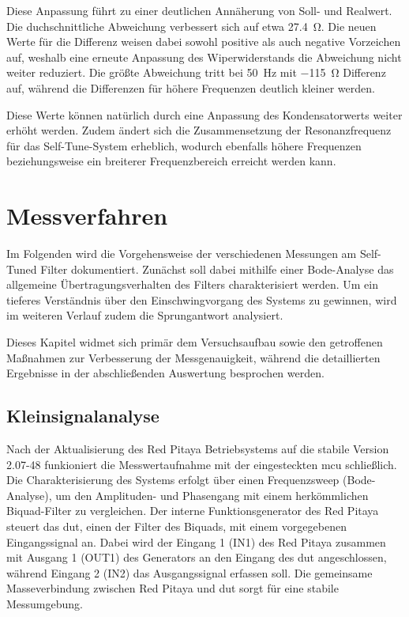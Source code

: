 \documentclass[../main_config.tex]{subfiles}
\begin{document}
Diese Anpassung führt zu einer deutlichen Annäherung von Soll- und Realwert. Die duchschnittliche Abweichung verbessert sich auf etwa \SI{27.4}{\ohm}. Die neuen Werte für die Differenz weisen dabei sowohl positive als auch negative Vorzeichen auf, weshalb eine erneute Anpassung des Wiperwiderstands die Abweichung nicht weiter reduziert. Die größte Abweichung tritt bei \SI{50}{\hertz} mit \SI{-115}{\ohm} Differenz auf, während die Differenzen für höhere Frequenzen deutlich kleiner werden.\par
\medskip

Diese Werte können natürlich durch eine Anpassung des Kondensatorwerts weiter erhöht werden. Zudem ändert sich die Zusammensetzung der Resonanzfrequenz für das Self-Tune-System erheblich, wodurch ebenfalls höhere Frequenzen beziehungsweise ein breiterer Frequenzbereich erreicht werden kann. \par
\medskip




\section{Messverfahren}

Im Folgenden wird die Vorgehensweise der verschiedenen Messungen am Self-Tuned Filter dokumentiert. Zunächst soll dabei mithilfe einer Bode-Analyse das allgemeine Übertragungsverhalten des Filters charakterisiert werden. Um ein tieferes Verständnis über den Einschwingvorgang des Systems zu gewinnen, wird im weiteren Verlauf zudem die Sprungantwort analysiert.\par
\medskip

Dieses Kapitel widmet sich primär dem Versuchsaufbau sowie den getroffenen Maßnahmen zur Verbesserung der Messgenauigkeit, während die detaillierten Ergebnisse in der abschließenden Auswertung besprochen werden.\par
\medskip

\subsection{Kleinsignalanalyse}
\label{sec:mess_ac}




Nach der Aktualisierung des Red Pitaya Betriebsystems auf die stabile Version 2.07-48 funkioniert die Messwertaufnahme mit der eingesteckten \gls{mcu} schließlich. Die Charakterisierung des Systems erfolgt über einen Frequenzsweep (Bode-Analyse), um den Amplituden- und Phasengang mit einem herkömmlichen Biquad-Filter zu vergleichen. Der interne Funktionsgenerator des Red Pitaya steuert das \gls{dut}, einen der Filter des Biquads, mit einem vorgegebenen Eingangssignal an. Dabei wird der Eingang 1 (IN1) des Red Pitaya zusammen mit Ausgang 1 (OUT1) des Generators an den Eingang des \gls{dut} angeschlossen, während Eingang 2 (IN2) das Ausgangssignal erfassen soll. Die gemeinsame Masseverbindung zwischen Red Pitaya und \gls{dut} sorgt für eine stabile Messumgebung.\par
\medskip
\end{document}

